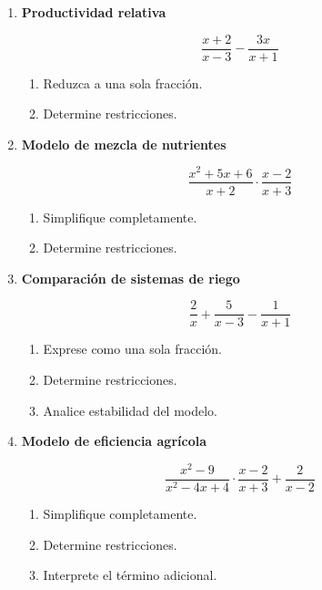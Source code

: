 \documentclass[11pt]{article}
\begin{document}
\begin{enumerate}
			
				\item \textbf{Productividad relativa}
				
				\[
				\frac{x+2}{x-3}-\frac{3x}{x+1}
				\]
				
				\begin{enumerate}[label=\alph*)]
					\item Reduzca a una sola fracción.
					\item Determine restricciones.
					
				\end{enumerate}
				
					\newpage 
				
				\vspace*{1em}
				\item \textbf{Modelo de mezcla de nutrientes}
				
				\[
				\frac{x^2+5x+6}{x+2}\cdot\frac{x-2}{x+3}
				\]
				
				\begin{enumerate}[label=\alph*)]
					\item Simplifique completamente.
					\item Determine restricciones.
					
				\end{enumerate}
				
				\item \textbf{Comparación de sistemas de riego}
				
				\[
				\frac{2}{x}+\frac{5}{x-3}-\frac{1}{x+1}
				\]
				
				\begin{enumerate}[label=\alph*)]
					\item Exprese como una sola fracción.
					\item Determine restricciones.
					\item Analice estabilidad del modelo.
				\end{enumerate}
				
				\item \textbf{Modelo de eficiencia agrícola}
				
				\[
				\frac{x^2-9}{x^2-4x+4}\cdot\frac{x-2}{x+3}+\frac{2}{x-2}
				\]
				
				\begin{enumerate}[label=\alph*)]
					\item Simplifique completamente.
					\item Determine restricciones.
					\item Interprete el término adicional.
				\end{enumerate}
				

\end{enumerate}
\end{document}
